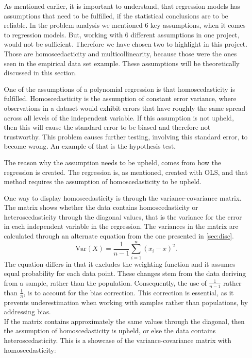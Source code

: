 As mentioned earlier, it is important to understand, that regression models has assumptions that need to be fulfilled, if the statistical conclusions are to be reliable. In the problem analysis we mentioned 6 key assumptions, when it comes to regression models. But, working with 6 different assumptions in one project, would not be sufficient. Therefore we have chosen two to highlight in this project. Those are homoscedacticity and multicollinearity, because those were the ones seen in the empirical data set example. These assumptions will be theoretically discussed in this section. \newline 

One of the assumptions of a polynomial regression is that homoscedasticity is fulfilled. Homoscedasticity is the assumption of constant error variance, where observations in a dataset would exhibit errors that have roughly the same spread across all levels of the independent variable. If this assumption is not upheld, then this will cause the standard error to be biased and therefore not trustworthy. This problem causes further testing, involving this standard error, to become wrong. An example of that is the hypothesis test.\newline

\noindent The reason why the assumption needs to be upheld, comes from how the regression is created. The regression is, as mentioned, created with OLS, and that method requires the assumption of homoscedasticity to be upheld.\newline

\noindent One way to display homoscedasticity is through the variance-covariance matrix. The matrix shows whether the data contains homoscedasticity or heteroscedasticity through the diagonal values, that is the variance for the error in each independent variable in the regression. The variances in the matrix are calculated through an alternate equation from the one presented in \autoref{sec:disc}.
\begin{equation}
	\text{Var}(X) = \frac{1}{n - 1} \sum_{i=1}^{n} (x_i - \bar{x})^2.
\end{equation}
The equation differs in that it excludes the weighting function and it assumes equal probability for each data point. These changes stem from the data deriving from a sample, rather than the population. Consequently, the use of $\frac{1}{n-1}$ rather than $\frac{1}{n}$, is to account for the bias correction. This correction is essential, as it prevents underestimation when working with samples rather than populations, by addressing bias.\\
If the matrix contains approximately the same values through the diagonal, then the assumption of homoscedasticity is upheld, or else the data contains heteroscedasticity. This is a showcase of the variance-covariance matrix with homoscedasticity:



